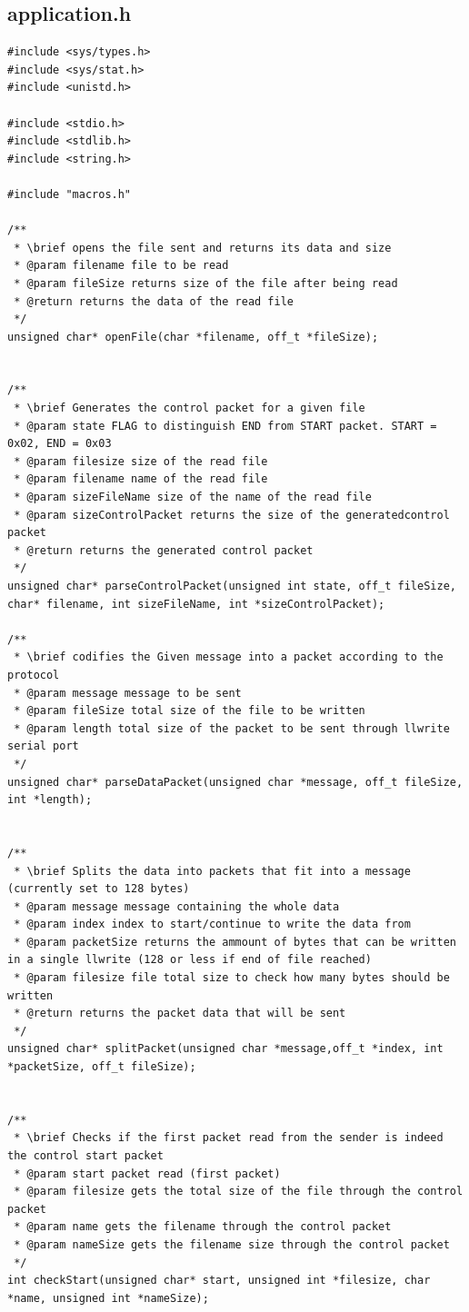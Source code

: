 \documentclass[11pt]{article}
\begin{document}
\pagebreak

\subsection{application.h}

\begin{lstlisting}[style=CStyle]
#include <sys/types.h>
#include <sys/stat.h>
#include <unistd.h>

#include <stdio.h>
#include <stdlib.h>
#include <string.h>

#include "macros.h"

/**
 * \brief opens the file sent and returns its data and size
 * @param filename file to be read
 * @param fileSize returns size of the file after being read
 * @return returns the data of the read file
 */
unsigned char* openFile(char *filename, off_t *fileSize);


/**
 * \brief Generates the control packet for a given file
 * @param state FLAG to distinguish END from START packet. START = 0x02, END = 0x03
 * @param filesize size of the read file
 * @param filename name of the read file
 * @param sizeFileName size of the name of the read file
 * @param sizeControlPacket returns the size of the generatedcontrol packet
 * @return returns the generated control packet
 */
unsigned char* parseControlPacket(unsigned int state, off_t fileSize, char* filename, int sizeFileName, int *sizeControlPacket);

/**
 * \brief codifies the Given message into a packet according to the protocol
 * @param message message to be sent
 * @param fileSize total size of the file to be written
 * @param length total size of the packet to be sent through llwrite serial port
 */
unsigned char* parseDataPacket(unsigned char *message, off_t fileSize, int *length);


/**
 * \brief Splits the data into packets that fit into a message (currently set to 128 bytes)
 * @param message message containing the whole data
 * @param index index to start/continue to write the data from
 * @param packetSize returns the ammount of bytes that can be written in a single llwrite (128 or less if end of file reached)
 * @param filesize file total size to check how many bytes should be written
 * @return returns the packet data that will be sent
 */
unsigned char* splitPacket(unsigned char *message,off_t *index, int *packetSize, off_t fileSize);


/**
 * \brief Checks if the first packet read from the sender is indeed the control start packet
 * @param start packet read (first packet)
 * @param filesize gets the total size of the file through the control packet
 * @param name gets the filename through the control packet
 * @param nameSize gets the filename size through the control packet
 */
int checkStart(unsigned char* start, unsigned int *filesize, char *name, unsigned int *nameSize);



\end{lstlisting}
\end{document}
